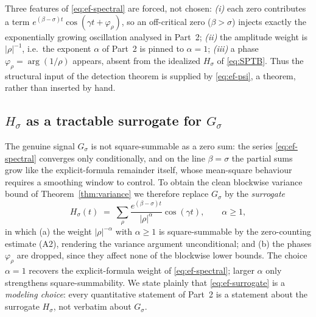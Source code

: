 \begin{remark}\label{rmk:ef-theorem}
Three features of \eqref{eq:ef-spectral} are forced, not chosen:
\emph{(i)} each zero contributes a term $e^{(\beta-\sigma)t}\cos(\gamma t+\varphi_\rho)$,
so an off-critical zero ($\beta>\sigma$) injects exactly the exponentially
growing oscillation analysed in Part~2;
\emph{(ii)} the amplitude weight is $|\rho|^{-1}$, i.e.\ the exponent
$\alpha$ of Part~2 is pinned to $\alpha=1$;
\emph{(iii)} a phase $\varphi_\rho=\arg(1/\rho)$ appears, absent from the
idealized $H_\sigma$ of \eqref{eq:SPTB}. Thus the structural input of the
detection theorem is supplied by \eqref{eq:ef-psi}, a theorem, rather than
inserted by hand.
\end{remark}

\subsection{$H_\sigma$ as a tractable surrogate for $G_\sigma$}\label{subsec:surrogate}

The genuine signal $G_\sigma$ is not square-summable as a zero sum: the
series \eqref{eq:ef-spectral} converges only conditionally, and on the line
$\beta=\sigma$ the partial sums grow like the explicit-formula remainder
itself, whose mean-square behaviour requires a smoothing window to control.
To obtain the clean blockwise variance bound of Theorem~\ref{thm:variance} we
therefore replace $G_\sigma$ by the \emph{surrogate}
\begin{equation}
H_\sigma(t)\;=\;\sum_{\rho}\frac{e^{(\beta-\sigma)t}}{|\rho|^{\alpha}}\cos(\gamma t),
\qquad \alpha\ge 1,
\label{eq:ef-surrogate}
\end{equation}
in which (a) the weight $|\rho|^{-\alpha}$ with $\alpha\ge1$ is square-summable
by the zero-counting estimate (A2), rendering the variance argument
unconditional; and (b) the phases $\varphi_\rho$ are dropped, since they affect
none of the blockwise lower bounds. The choice $\alpha=1$ recovers the
explicit-formula weight of \eqref{eq:ef-spectral}; larger $\alpha$ only
strengthens square-summability. We state plainly that \eqref{eq:ef-surrogate}
is a \emph{modeling choice}: every quantitative statement of Part~2 is a
statement about the surrogate $H_\sigma$, not verbatim about $G_\sigma$.

